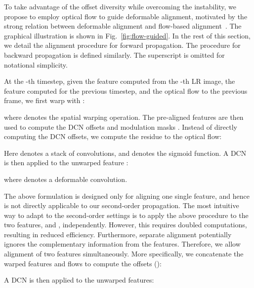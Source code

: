 \documentclass[10pt,twocolumn,letterpaper]{article}
\begin{document}
To take advantage of the offset diversity while overcoming the instability, we propose to employ optical flow to guide deformable alignment, motivated by the strong relation between deformable alignment and flow-based alignment~\cite{chan2021understanding}. The graphical illustration is shown in Fig.~\ref{fig:flow-guided}. In the rest of this section, we detail the alignment procedure for forward propagation. The procedure for backward propagation is defined similarly. The superscript  is omitted for notational simplicity.

At the -th timestep, given the feature  computed from the -th LR image, the feature  computed for the previous timestep, and the optical flow  to the previous frame, we first warp  with :

where  denotes the spatial warping operation.
The pre-aligned features are then used to compute the DCN offsets  and modulation masks . Instead of directly computing the DCN offsets, we compute the residue to the optical flow:

Here  denotes a stack of convolutions, and  denotes the sigmoid function.
A DCN is then applied to the unwarped feature :

where  denotes a deformable convolution.

The above formulation is designed only for aligning one single feature, and hence is not directly applicable to our second-order propagation. The most intuitive way to adapt to the second-order settings is to apply the above procedure to the two features,  and , independently. However, this requires doubled computations, resulting in reduced efficiency. Furthermore, separate alignment potentially ignores the complementary information from the features. Therefore, we allow alignment of two features simultaneously. More specifically, we concatenate the warped features and flows to compute the offsets  ():

A DCN is then applied to the unwarped features:
\end{document}
